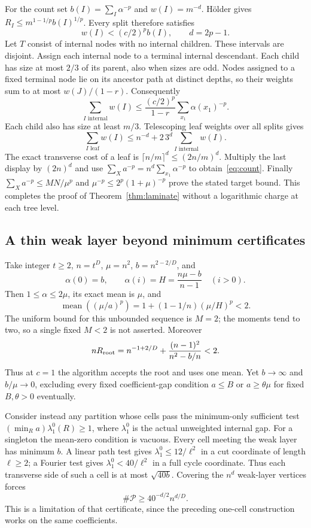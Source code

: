\documentclass[11pt]{article}
\newcommand{\Pcal}{\mathcal P}
\begin{document}
For the count set $b(I)=\sum_I\alpha^{-p}$ and $w(I)=m^{-d}$.
H\"older gives $R_I\le m^{1-1/p}b(I)^{1/p}$. Every split therefore satisfies
\begin{equation}\label{eq:charge}
 w(I)<(c/2)^p b(I),\qquad d=2p-1.
\end{equation}
Let $T$ consist of internal nodes with no internal children. These intervals
are disjoint. Assign each internal node to a terminal internal descendant.
Each child has size at most $2/3$ of its parent, also when sizes are odd.
Nodes assigned to a fixed terminal node lie on its ancestor path at distinct
depths, so their weights sum to at most $w(J)/(1-r)$. Consequently
\[
 \sum_{I\text{ internal}}w(I)
 \le\frac{(c/2)^p}{1-r}\sum_{x_1}\alpha(x_1)^{-p}.
\]
Each child also has size at least $m/3$. Telescoping leaf weights over all
splits gives
\[
 \sum_{I\text{ leaf}}w(I)
 \le n^{-d}+2\,3^d\sum_{I\text{ internal}}w(I).
\]
The exact transverse cost of a leaf is $\lceil n/m\rceil^d\le(2n/m)^d$.
Multiply the last display by $(2n)^d$ and use
$\sum_Xa^{-p}=n^d\sum_{x_1}\alpha^{-p}$ to obtain~\eqref{eq:count}.
Finally $\sum_Xa^{-p}\le MN/\mu^p$ and
$\mu^{-p}\le2^p(1+\mu)^{-p}$ prove the stated target bound.
This completes the proof of Theorem~\ref{thm:laminate} without a logarithmic
charge at each tree level.

\subsection{A thin weak layer beyond minimum certificates}
Take integer $t\ge2$, $n=t^D$, $\mu=n^2$, $b=n^{2-2/D}$, and
\[
 \alpha(0)=b,\qquad \alpha(i)=H=\frac{n\mu-b}{n-1}\quad(i>0).
\]
Then $1\le\alpha\le2\mu$, its exact mean is $\mu$, and
\begin{equation}\label{eq:moment-layer}
 \operatorname{mean}((\mu/a)^p)
 =1+(1-1/n)(\mu/H)^p<2.
\end{equation}
The uniform bound for this unbounded sequence is $M=2$; the moments tend
to two, so a single fixed $M<2$ is not asserted. Moreover
\[
 nR_{\rm root}=n^{-1+2/D}
       +\frac{(n-1)^2}{n^2-b/n}<2.
\]
Thus at $c=1$ the algorithm accepts the root and uses one mean.
Yet $b\to\infty$ and $b/\mu\to0$, excluding every fixed coefficient-gap
condition $a\le B$ or $a\ge\theta\mu$ for fixed $B,\theta>0$ eventually.

Consider instead any partition whose cells pass the minimum-only sufficient
test $(\min_Ra)\lambda_1^0(R)\ge1$, where $\lambda_1^0$ is the actual
unweighted internal gap. For a singleton the mean-zero condition is vacuous.
Every cell meeting the weak layer has minimum $b$. A linear path test gives
$\lambda_1^0\le12/\ell^2$ in a cut coordinate of length $\ell\ge2$;
a Fourier test gives $\lambda_1^0<40/\ell^2$ in a full cycle coordinate.
Thus each transverse side of such a cell is at most $\sqrt{40b}$.
Covering the $n^d$ weak-layer vertices forces
\[
 \#\Pcal\ge40^{-d/2}n^{d/D}.
\]
This is a limitation of that certificate, since the preceding one-cell
construction works on the same coefficients.
\end{document}
